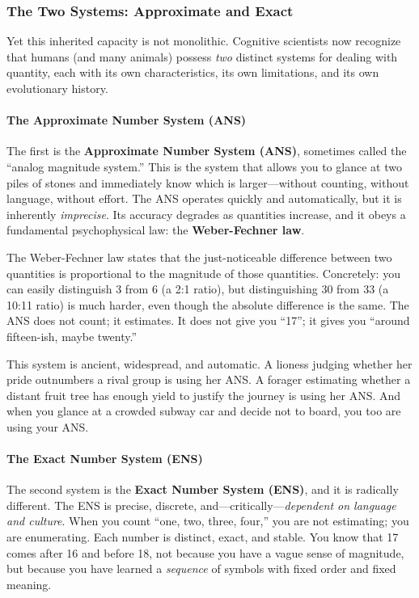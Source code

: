 \subsubsection{The Two Systems: Approximate and Exact}

Yet this inherited capacity is not monolithic. Cognitive scientists now recognize that humans (and many animals) possess \textit{two} distinct systems for dealing with quantity, each with its own characteristics, its own limitations, and its own evolutionary history.

\paragraph{The Approximate Number System (ANS)}

The first is the \textbf{Approximate Number System (ANS)}, sometimes called the ``analog magnitude system.'' This is the system that allows you to glance at two piles of stones and immediately know which is larger---without counting, without language, without effort. The ANS operates quickly and automatically, but it is inherently \textit{imprecise}. Its accuracy degrades as quantities increase, and it obeys a fundamental psychophysical law: the \textbf{Weber-Fechner law}.

The Weber-Fechner law states that the just-noticeable difference between two quantities is proportional to the magnitude of those quantities. Concretely: you can easily distinguish 3 from 6 (a 2:1 ratio), but distinguishing 30 from 33 (a 10:11 ratio) is much harder, even though the absolute difference is the same. The ANS does not count; it estimates. It does not give you ``17''; it gives you ``around fifteen-ish, maybe twenty.''

This system is ancient, widespread, and automatic. A lioness judging whether her pride outnumbers a rival group is using her ANS. A forager estimating whether a distant fruit tree has enough yield to justify the journey is using her ANS. And when you glance at a crowded subway car and decide not to board, you too are using your ANS.

\paragraph{The Exact Number System (ENS)}

The second system is the \textbf{Exact Number System (ENS)}, and it is radically different. The ENS is precise, discrete, and---critically---\textit{dependent on language and culture}. When you count ``one, two, three, four,'' you are not estimating; you are enumerating. Each number is distinct, exact, and stable. You know that 17 comes after 16 and before 18, not because you have a vague sense of magnitude, but because you have learned a \textit{sequence} of symbols with fixed order and fixed meaning.

